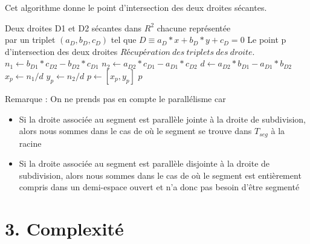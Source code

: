 \documentclass[a4paper,12pt]{report}	%
\begin{document}
	\noindent Cet algorithme donne le point d'intersection des deux droites sécantes.
	
	\begin{algorithm}
	\caption{$intersection(D1, D2)$}
	\label{Modele pour un algo}
	\begin{algorithmic} [1]
	\REQUIRE Deux droites D1 et D2 sécantes dans $R^2$ chacune représentée \\par un triplet $(a_{D}, b_{D}, c_{D})$ tel que $D \equiv a_{D}*x + b_{D}*y + c_{D} = 0$
	\ENSURE Le point p d'intersection des deux droites
	\STATE $Récupération\ des\ triplets\ des\ droite.$
	\STATE $ n_{1} \gets b_{D1}*c_{D2} - b_{D2}*c_{D1}$	
	\STATE $ n_{2} \gets a_{D2}*c_{D1} - a_{D1}*c_{D2}$
	\STATE $ d \gets a_{D2}*b_{D1} - a_{D1}*b_{D2}$
	\STATE $ x_{p} \gets n_{1} / d$
	\STATE $ y_{p} \gets n_{2} / d$
	\STATE $ p \gets [x_{p}, y_{p}]$
	\RETURN $ p $
	\end{algorithmic}
	\end{algorithm}
	
\noindent Remarque : On ne prends pas en compte le parallélisme car 
\begin{itemize}
\item Si la droite associée au segment est parallèle jointe à la droite de subdivision, alors nous sommes dans le cas de où le segment se trouve dans $T_{seg}$ à la racine
\item Si la droite associée au segment est parallèle disjointe à la droite de subdivision, alors nous sommes dans le cas de où le segment est entièrement compris dans un demi-espace ouvert et n'a donc pas besoin d'être segmenté
\end{itemize}

\newpage

	{\section*{3. Complexité}}
	
\end{document}
